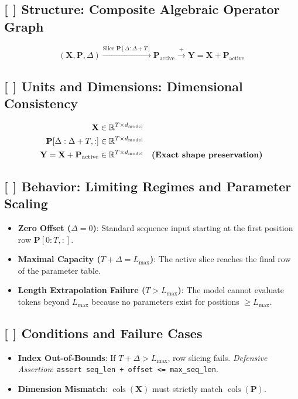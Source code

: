 \documentclass[11pt,a4paper]{article}
\theoremstyle{definition}
\begin{document}
\subsection{[ ] Structure: Composite Algebraic Operator Graph}
{\boldmath
\begin{equation}
(\mathbf{X}, \mathbf{P}, \Delta) \xrightarrow{\text{Slice } \mathbf{P}[\Delta:\Delta+T]} \mathbf{P}_{\text{active}} \xrightarrow{+} \mathbf{Y} = \mathbf{X} + \mathbf{P}_{\text{active}}
\end{equation}
}

\subsection{[ ] Units and Dimensions: Dimensional Consistency}
{\boldmath
\begin{align}
\mathbf{X} &\in \mathbb{R}^{T \times d_{\text{model}}} \\
\mathbf{P}[\Delta : \Delta + T, :] &\in \mathbb{R}^{T \times d_{\text{model}}} \\
\mathbf{Y} = \mathbf{X} + \mathbf{P}_{\text{active}} &\in \mathbb{R}^{T \times d_{\text{model}}} \quad \text{\textbf{(Exact shape preservation)}}
\end{align}
}

\subsection{[ ] Behavior: Limiting Regimes and Parameter Scaling}
\begin{itemize}
    \item \textbf{Zero Offset ($\Delta = 0$)}: Standard sequence input starting at the first position row $\mathbf{P}[0:T, :]$.
    \item \textbf{Maximal Capacity ($T + \Delta = L_{\text{max}}$)}: The active slice reaches the final row of the parameter table.
    \item \textbf{Length Extrapolation Failure ($T > L_{\text{max}}$)}: The model cannot evaluate tokens beyond $L_{\text{max}}$ because no parameters exist for positions $\ge L_{\text{max}}$.
\end{itemize}

\subsection{[ ] Conditions and Failure Cases}
\begin{itemize}
    \item \textbf{Index Out-of-Bounds}: If $T + \Delta > L_{\text{max}}$, row slicing fails. \emph{Defensive Assertion}: \texttt{assert seq\_len + offset <= max\_seq\_len}.
    \item \textbf{Dimension Mismatch}: $\operatorname{cols}(\mathbf{X})$ must strictly match $\operatorname{cols}(\mathbf{P})$.
\end{itemize}
\end{document}
